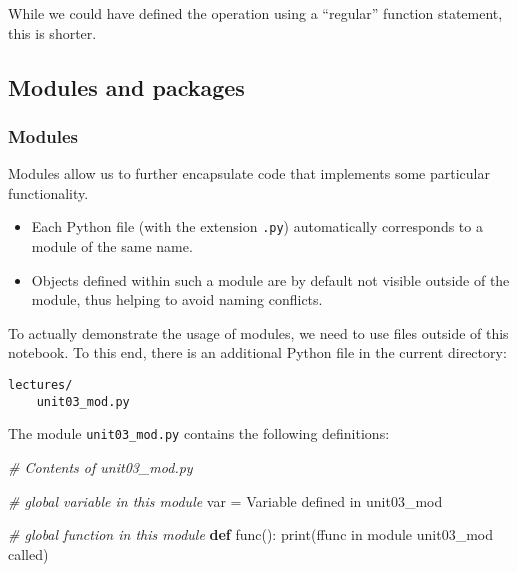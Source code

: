 \documentclass{scrartcl}
\providecommand{\tightlist}{%
      \setlength{\itemsep}{0pt}\setlength{\parskip}{0pt}}
\newenvironment{Shaded}{}{}
\newcommand{\KeywordTok}[1]{\textcolor[rgb]{0.00,0.44,0.13}{\textbf{{#1}}}}
\newcommand{\StringTok}[1]{\textcolor[rgb]{0.25,0.44,0.63}{{#1}}}
\newcommand{\CommentTok}[1]{\textcolor[rgb]{0.38,0.63,0.69}{\textit{{#1}}}}
\newcommand{\NormalTok}[1]{{#1}}
\newcommand{\SpecialStringTok}[1]{\textcolor[rgb]{0.73,0.40,0.53}{{#1}}}
\newcommand{\OperatorTok}[1]{\textcolor[rgb]{0.40,0.40,0.40}{{#1}}}
\newcommand{\BuiltInTok}[1]{{#1}}
\begin{document}
    While we could have defined the operation using a ``regular'' function
statement, this is shorter.


\hypertarget{modules-and-packages}{%
\subsection{Modules and packages}\label{modules-and-packages}}

\hypertarget{modules}{%
\subsubsection{Modules}\label{modules}}

Modules allow us to further encapsulate code that implements some
particular functionality.

\begin{itemize}
\tightlist
\item
  Each Python file (with the extension \texttt{.py}) automatically
  corresponds to a module of the same name.
\item
  Objects defined within such a module are by default not visible
  outside of the module, thus helping to avoid naming conflicts.
\end{itemize}

To actually demonstrate the usage of modules, we need to use files
outside of this notebook. To this end, there is an additional Python
file in the current directory:

\begin{verbatim}
lectures/
    unit03_mod.py
\end{verbatim}

The module \texttt{unit03\_mod.py} contains the following definitions:

\begin{Shaded}
\begin{Highlighting}[]
\CommentTok{\# Contents of unit03\_mod.py}

\CommentTok{\# global variable in this module}
\NormalTok{var }\OperatorTok{=} \StringTok{\textquotesingle{}Variable defined in unit03\_mod\textquotesingle{}}

\CommentTok{\# global function in this module}
\KeywordTok{def}\NormalTok{ func():}
    \BuiltInTok{print}\NormalTok{(}\SpecialStringTok{f\textquotesingle{}func in module unit03\_mod called\textquotesingle{}}\NormalTok{)}
\end{Highlighting}
\end{Shaded}
\end{document}
